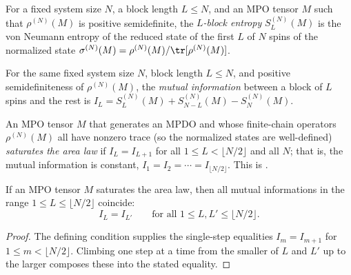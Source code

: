 \begin{definition}\label{def:block_entropy}
    \leanok
    For a fixed system size $N$, a block length $L\le N$, and an MPO tensor $M$
    such that $\rho^{(N)}(M)$ is positive semidefinite, the \emph{$L$-block entropy}
    $S_L^{(N)}(M)$ is the von Neumann entropy of the reduced state of the first
    $L$ of $N$ spins of the normalized state
    $\sigma^{(N)}(M) = \rho^{(N)}(M) / \tr[\rho^{(N)}(M)]$.
\end{definition}

\begin{definition}\label{def:mutual_info_chain}
    \leanok
    For the same fixed system size $N$, block length $L\le N$, and positive
    semidefiniteness of $\rho^{(N)}(M)$, the \emph{mutual information} between
    a block of $L$ spins and the rest is
    $I_L = S_L^{(N)}(M) + S_{N-L}^{(N)}(M) - S_N^{(N)}(M)$.
\end{definition}

\begin{definition}\label{def:is_sal}
    \leanok
    An MPO tensor $M$ that generates an MPDO and whose finite-chain operators
    $\rho^{(N)}(M)$ all have nonzero trace (so the normalized states are
    well-defined) \emph{saturates the area law} if
    $I_L = I_{L+1}$ for all $1 \le L < \lfloor N/2 \rfloor$ and all $N$; that is,
    the mutual information is constant, $I_1 = I_2 = \cdots = I_{\lfloor N/2 \rfloor}$.
    This is \cite[Definition~4.6, line~811]{Cirac2016MPDO_arXiv}.
\end{definition}

\begin{lemma}
    \label{lem:sal_const}
    \leanok
    If an MPO tensor $M$ saturates the area law, then all mutual informations in
    the range $1\le L\le\lfloor N/2\rfloor$ coincide:
    \[
        I_L = I_{L'}
        \qquad
        \text{for all } 1\le L, L'\le \lfloor N/2\rfloor .
    \]
\end{lemma}
\begin{proof}\leanok
    The defining condition supplies the single-step equalities $I_m = I_{m+1}$ for
    $1\le m<\lfloor N/2\rfloor$. Climbing one step at a time from the smaller of $L$
    and $L'$ up to the larger composes these into the stated equality.
\end{proof}

